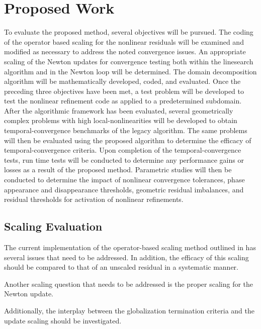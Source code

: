 \chapter{Proposed Work}
\label{chap:proposal}
To evaluate the proposed method, several objectives will be pursued.
The coding of the operator based scaling for the nonlinear residuals will be examined and modified as necessary to address the noted convergence issues.
An appropriate scaling of the Newton updates for convergence testing both within the linesearch algorithm and in the Newton loop will be determined.
The domain decomposition algorithm will be mathematically developed, coded, and evaluated.
Once the preceding three objectives have been met, a test problem will be developed to test the nonlinear refinement code as applied to a predetermined subdomain.
After the algorithmic framework has been evaluated, several geometrically complex problems with high local-nonlinearities will be developed to obtain temporal-convergence benchmarks of the legacy algorithm.
The same problems will then be evaluated using the proposed algorithm to determine the efficacy of temporal-convergence criteria.
Upon completion of the temporal-convergence tests, run time tests will be conducted to determine any performance gains or losses as a result of the proposed method.
Parametric studies will then be conducted to determine the impact of nonlinear convergence tolerances, phase appearance and disappearance thresholds, geometric residual imbalances, and residual thresholds for activation of nonlinear refinements.

\section{Scaling Evaluation}
\label{sect:proposal_scaling}
The current implementation of the operator-based scaling method outlined in  has several issues that need to be addressed.
In addition, the efficacy of this scaling should be compared to that of an unscaled residual in a systematic manner.

Another scaling question that needs to be addressed is the proper scaling for the Newton update.

Additionally, the interplay between the globalization termination criteria and the update scaling should be investigated. 

